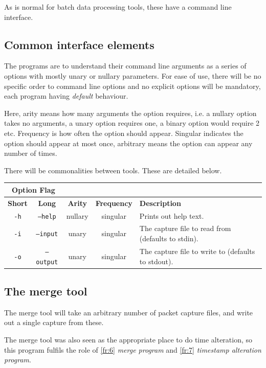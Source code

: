 \documentclass[10pt,a4paper,notitlepage,twoside]{report}
\begin{document}
As is normal for batch data processing tools, these have a command line interface.

\subsection{Common interface elements}
The programs are to understand their command line arguments as a series of options with mostly unary or nullary parameters. For ease of use, there will be no specific order to command line options and no explicit options will be mandatory, each program having \emph{default} behaviour.

Here, arity means how many arguments the option requires, i.e. a nullary option takes no arguments,  a unary option requires one, a binary option would require 2 etc.
Frequency is how often the option should appear. Singular indicates the option should appear at most once, arbitrary means the option can appear any number of times.

There will be commonalities between tools. These are detailed below.

\begin{tabularx}{\textwidth}{|c|c|c|c|X|}
\cline{1-2}
\multicolumn{2}{|c|}{\textbf{Option Flag}} & \multicolumn{3}{c}{}\\ \hline
\textbf{Short} & \textbf{Long} & \textbf{Arity} & \textbf{Frequency} & \textbf{Description} \\ \hline
\texttt{-h} & \texttt{--help} & nullary & singular & Prints out help text.\\\hline
\texttt{-i} & \texttt{--input} & unary & singular & The capture file to read from (defaults to stdin).\\ \hline
\texttt{-o} & \texttt{--output} & unary & singular & The capture file to write to (defaults to stdout).\\ \hline
\end{tabularx}

\subsection{The merge tool}
The merge tool will take an arbitrary number of packet capture files, and write out a single capture from these.

The merge tool was also seen as the appropriate place to do time alteration, so this program fulfils the role of \ref{fr:6} \emph{merge program} and \ref{fr:7} \emph{timestamp alteration program}.
\end{document}
